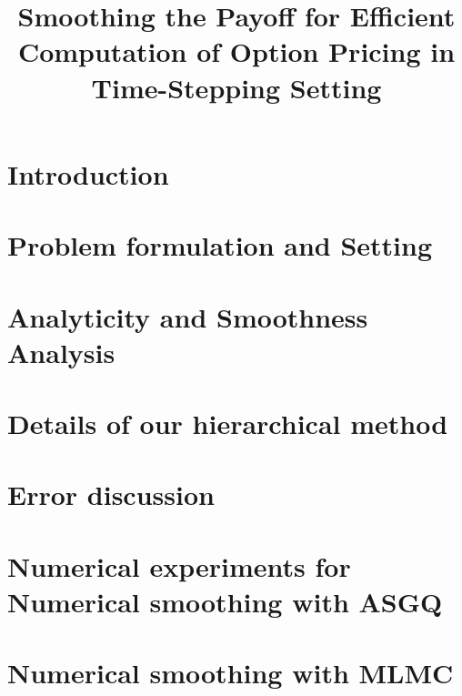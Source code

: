 \documentclass[11pt]{article}
\title{ Smoothing  the  Payoff for  Efficient Computation of Option Pricing in
  Time-Stepping Setting}
\date{ }
\begin{document}
\maketitle

%


\section{Introduction}



\section{Problem formulation and Setting}\label{sec:General setting}





%
\section{Analyticity  and Smoothness Analysis}\label{sec:Analiticity Analysis}

\section{Details of our hierarchical method}\label{sec:Details of our approach}



\section{Error discussion}\label{sec:Error discussion}


\section{Numerical experiments for Numerical smoothing with ASGQ}

\section{Numerical smoothing with MLMC}



 


%
\end{document}

